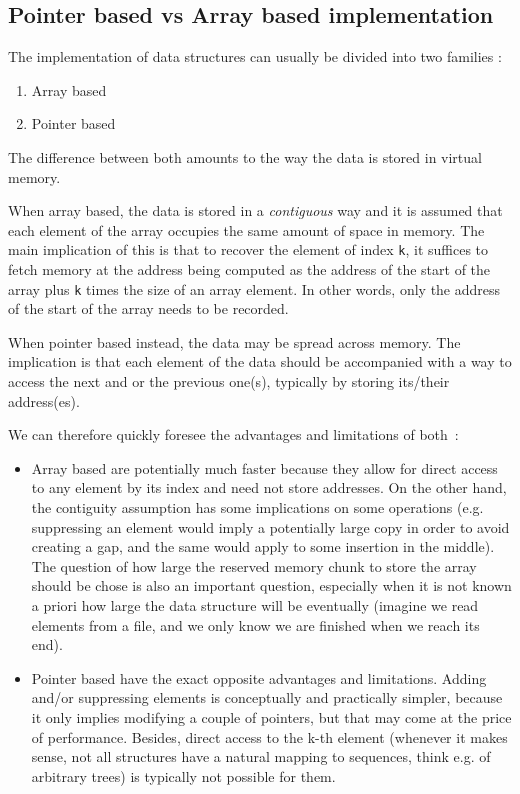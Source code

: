 \documentclass[12pt]{article}
\theoremstyle{plain}
\theoremstyle{remark}
\begin{document}
\subsection{Pointer based vs Array based implementation}

The implementation of data structures can usually be divided into two families : 
\begin{enumerate}
	\item Array based
	\item Pointer based
\end{enumerate}
The difference between both amounts to the way the data is stored in virtual
memory. 

\medskip

When array based, the data is stored in a {\it contiguous} way and it is
assumed that each element of the array occupies the same amount of space in
memory. The main implication of this is that to recover the element of index
{\tt k}, it suffices to fetch memory at the address being computed as the address
of the start of the array plus {\tt k} times the size of an array element. In
other words, only the address of the start of the array needs to be recorded. 

When pointer based instead, the data may be spread across memory. The implication is
that each element of the data should be accompanied with a way to access the
next and or the previous one(s), typically by storing its/their address(es).


\medskip
\noindent
We can therefore quickly foresee the advantages and limitations of both~: 
\begin{itemize}
	\item Array based are potentially much faster because they allow for
		direct access to any element by its index and need not store 
		addresses. On the other hand,
		the contiguity assumption has some implications on some
		operations (e.g. suppressing an element would imply a
		potentially large copy in order to avoid creating a gap, and the
		same would apply to some insertion in the middle). The
		question of how large the reserved memory chunk to store the
		array should be chose is also an important question, especially
		when it is not known a priori how large the data structure will
		be eventually (imagine we read elements from a file, and we only
		know we are finished when we reach its end).
	\item Pointer based have the exact opposite advantages and limitations. 
		Adding and/or suppressing elements is conceptually and
		practically simpler, because it only implies modifying a
		couple of pointers, but that may come at the price of
		performance. Besides, direct access to the k-th element 
		(whenever it makes sense, not all structures have a natural
		mapping to sequences, think e.g. of arbitrary trees) 
		is typically not possible for them.
\end{itemize}
\end{document}
